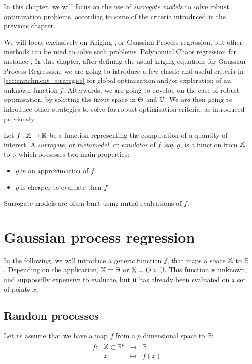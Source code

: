 \documentclass[../../Main_ManuscritThese.tex]{subfiles}
\begin{document}
 In this chapter, we will focus on the use of \emph{surrogate models} to solve robust optimization problems, according to some of the criteria introduced in the previous chapter.

We will focus exclusively on Kriging \cite{krige_statistical_1951,matheron_traite_1962}, or Gaussian Process regression, but other methods can be used to solve such problems. Polynomial Chaos regression for instance \cite{wiener_homogeneous_1938,xiu_wiener--askey_2002,sudret_polynomial_2015},\cite{miranda_adjoint-based_2016}
In this chapter, after defining the usual kriging equations for Gaussian Process Regression, we are going to introduce a few classic and useful criteria in \cref{sec:enrichment_strategies} for global optimization and/or exploration of an unknown function $f$. Afterwards, we are going to develop on the case of robust optimisation, by splitting the input space in $\Theta$ and $\mathbb{U}$. We are then going to introduce other strategies to solve for robust optimisation criteria, as introduced previously.

\begin{definition}
  Let $f: \mathbb{X} \rightarrow \mathbb{R}$ be a function representing the computation of a quantity of interest. A \emph{surrogate}, or \emph{metamodel}, or \emph{emulator} of $f$, say $g$, is a function from $\mathbb{X}$ to $\mathbb{R}$ which possesses two main properties:
  \begin{itemize}
  \item $g$ is an approximation of $f$
  \item $g$ is cheaper to evaluate than $f$ 
  \end{itemize}
\end{definition}
Surrogate models are often built using initial evaluations of $f$.
\section{Gaussian process regression}
In the following, we will introduce a generic function $f$, that maps a space $\mathbb{X}$ to $\mathbb{R}$. Depending on the application, $\mathbb{X} = \Theta$ or $\mathbb{X} = \Theta \times \mathbb{U}$. This function is unknown, and supposedly expensive to evaluate, but it has already been evaluated on a set of points $x_i$
\cite{rasmussen_gaussian_2006}
\subsection{Random processes}
Let us assume that we have a map $f$ from a $p$ dimensional space to $\mathbb{R}$:
\begin{align}
  \begin{array}{rrcl}
    f: & \mathbb{X} \subset \mathbb{R}^p& \longrightarrow & \mathbb{R} \\
       & x & \longmapsto & f(x)
  \end{array}
\end{align}
\end{document}

